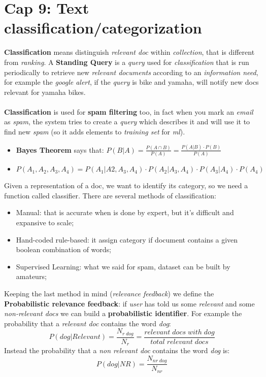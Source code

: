 \documentclass{article}
\begin{document}
\section{Cap 9: Text classification/categorization}
\textbf{Classification} means distinguish \emph{relevant doc} within \emph{collection}, that is different from \emph{ranking}. A \textbf{Standing Query} is a \emph{query} used for \emph{classification} that is run periodically to retrieve new \emph{relevant documents} according to an \emph{information need}, for example the \emph{google alert}, if the \emph{query} is bike and yamaha, will notify new docs relevant for yamaha bikes. \\\\
\textbf{Classification} is used for \textbf{spam filtering} too, in fact when you mark an \emph{email} as \emph{spam}, the system tries to create a \emph{query} which describes it and will use it to find new \emph{spam} (so it adds elements to \emph{training set} for \emph{ml}).
\begin{itemize}
\item \textbf{Bayes Theorem} says that: $P(B|A) = \frac{P(A\cap B)}{P(A)} = \frac{P(A|B) \cdot P(B)}{P(A)}$
\item $P(A_1, A_2, A_3, A_4) = P(A_1|A2, A_3, A_4) \cdot P(A_2 | A_3, A_4) \cdot P(A_3|A_4) \cdot P(A_4)$
\end{itemize}
Given a representation of a doc, we want to identify its category, so we need a function called classifier. There are several methods of classification:
\begin{itemize}
\item Manual: that is accurate when is done by expert, but it's difficult and expansive to scale;
\item Hand-coded rule-based: it assign category if document contains a given boolean combination of words;
\item Supervised Learning: what we said for spam, dataset can be built by amateurs;
\end{itemize}
Keeping the last method in mind (\emph{relevance feedback}) we define the \textbf{Probabilistic relevance feedback}: if \emph{user} has told us some \emph{relevant} and some \emph{non-relevant docs} we can build a \textbf{probabilistic identifier}. For example the probability that a \emph{relevant doc} contains the word \emph{dog}: 
\[P(dog|Relevant) = \frac{N_{r\; dog}}{N_r} = \frac{relevant\; docs\; with\; dog}{total\; relevant\; docs}\]
Instead the probability that a \emph{non relevant doc} contains the word \emph{dog} is:
\[P(dog|NR) = \frac{N_{nr\; dog}}{N_{nr}} \]
\end{document}
